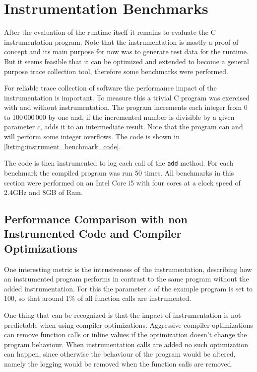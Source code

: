 \section{Instrumentation Benchmarks}
\label{sec:evaluation:instrumentation_benchmarks}

After the evaluation of the runtime itself it remains to evaluate the C instrumentation program.
Note that the instrumentation is mostly a proof of concept and its main purpose for now was to generate test data for the runtime.
But it seems feasible that it can be optimized and extended to become a general purpose trace collection tool, therefore some benchmarks were performed.

For reliable trace collection of software the performance impact of the instrumentation is important.
To measure this a trivial C program was exercised with and without instrumentation.
The program increments each integer from 0 to 100\,000\,000 by one and, if the incremented number is divisible by a given parameter \(c\), adds it to an intermediate result.
Note that the program  can and will perform some integer overflows.
The code is shown in \cref{listing:instrument_benchmark_code}.

\begin{figure}

\end{figure}

The code is then instrumented to log each call of the \lstinline{add} method.
For each benchmark the compiled program was run 50 times.
All benchmarks in this section were performed on an Intel Core i5 with four cores at a clock speed of 2.4GHz and 8GB of Ram.

\subsection{Performance Comparison with non Instrumented Code and Compiler Optimizations}
\label{sec:evaluation:instrumentation_benchmark:instr_vs_non_inst}

One interesting metric is the intrusiveness of the instrumentation, describing how an instrumented program performs in contrast to the same program without the added instrumentation.
For this the parameter \(c\) of the example program is set to 100, so that around 1\% of all function calls are instrumented.

One thing that can be recognized is that the impact of instrumentation is not predictable when using compiler optimizations.
Aggressive compiler optimizations can remove function calls or inline values if the optimization doesn't change the program behaviour.
When instrumentation calls are added no such optimization can happen, since otherwise the behaviour of the program would be altered, namely the logging would be removed when the function calls are removed.

